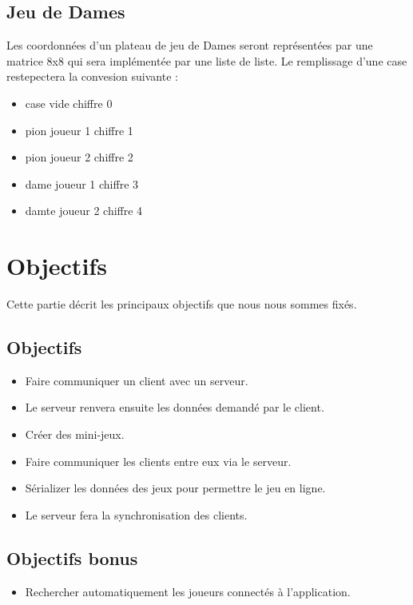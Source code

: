 \documentclass{report}
\begin{document}
\section{Jeu de Dames}
Les coordonnées d'un plateau de jeu de Dames seront représentées par une matrice 8x8 qui sera implémentée par une liste de liste.
Le remplissage d'une case restepectera la convesion suivante :
\begin{itemize}
	\item case vide \tabto{4cm} chiffre 0
	\item pion joueur 1 \tabto{4cm} chiffre 1
	\item pion joueur 2  \tabto{4cm} chiffre 2
	\item dame joueur 1 \tabto{4cm} chiffre 3
	\item damte joueur 2 \tabto{4cm} chiffre 4
\end{itemize}

\chapter{Objectifs}
Cette partie décrit les principaux objectifs que nous nous sommes fixés.
\section{Objectifs}\label{objectifs}
\begin{itemize}
	\item Faire communiquer un client avec un serveur.
	\item Le serveur renvera ensuite les données demandé par le client.
	\item Créer des mini-jeux.
	\item Faire communiquer les clients entre eux via le serveur.
	\item Sérializer les données des jeux pour permettre le jeu en ligne.
	\item Le serveur fera la synchronisation des clients.
\end{itemize}
\section{Objectifs bonus}\label{objectifs-bonus}
\begin{itemize}
	\item Rechercher automatiquement les joueurs connectés à l'application.
\end{itemize}
\end{document}
